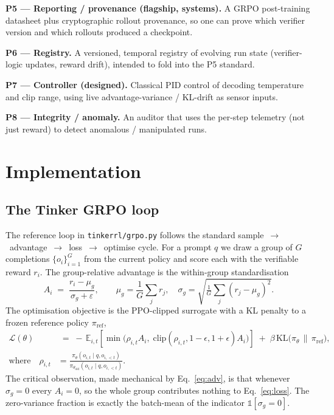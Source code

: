 \documentclass[12pt,a4paper]{report}
\begin{document}
\textbf{P5 --- Reporting / provenance (flagship, systems).} A GRPO post-training
datasheet plus cryptographic rollout provenance, so one can prove which verifier
version and which rollouts produced a checkpoint.


\textbf{P6 --- Registry.} A versioned, temporal registry of evolving run state
(verifier-logic updates, reward drift), intended to fold into the P5 standard.

\textbf{P7 --- Controller (designed).} Classical PID control of decoding temperature
and clip range, using live advantage-variance / KL-drift as sensor inputs.

\textbf{P8 --- Integrity / anomaly.} An auditor that uses the per-step telemetry
(not just reward) to detect anomalous / manipulated runs.

\section{Implementation}
\label{sec:impl}

\subsection{The Tinker GRPO loop}


The reference loop in \texttt{tinkerrl/grpo.py} follows the standard
sample~$\rightarrow$~advantage~$\rightarrow$~loss~$\rightarrow$~optimise cycle.
For a prompt $q$ we draw a group of $G$ completions $\{o_i\}_{i=1}^{G}$ from the
current policy and score each with the verifiable reward $r_i$. The
group-relative advantage is the within-group standardisation
\begin{equation}
A_i \;=\; \frac{r_i - \mu_g}{\sigma_g + \varepsilon},
\qquad
\mu_g = \frac{1}{G}\sum_{j} r_j,\quad
\sigma_g = \sqrt{\tfrac{1}{G}\sum_j (r_j-\mu_g)^2}.
\label{eq:adv}
\end{equation}
The optimisation objective is the PPO-clipped surrogate with a KL penalty to a
frozen reference policy $\pi_{\mathrm{ref}}$,
\begin{align}
\mathcal{L}(\theta) &\;=\;
-\,\mathbb{E}_{i,t}\!\left[
\min\!\big(\rho_{i,t}A_i,\;
\mathrm{clip}(\rho_{i,t},1-\epsilon,1+\epsilon)A_i\big)
\right]
\;+\; \beta\, \mathrm{KL}\!\big(\pi_\theta \,\|\, \pi_{\mathrm{ref}}\big),
\label{eq:loss}\\[0.2em]
\text{where}\quad
\rho_{i,t} &=\frac{\pi_\theta(o_{i,t}\mid q,o_{i,<t})}{\pi_{\theta_{\mathrm{old}}}(o_{i,t}\mid q,o_{i,<t})}.
\nonumber
\end{align}
The critical observation, made mechanical by Eq.~\eqref{eq:adv}, is that whenever
$\sigma_g = 0$ every $A_i = 0$, so the whole group contributes nothing to
Eq.~\eqref{eq:loss}. The zero-variance fraction is exactly the batch-mean of the
indicator $\mathbb{1}[\sigma_g = 0]$.
\end{document}
